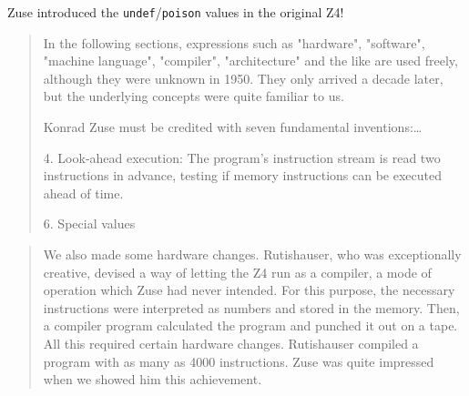 Zuse introduced the \texttt{undef}/\texttt{poison} values in the original Z4!
\begin{quotation}
In the following sections, expressions such as "hardware", "software", "machine language", "compiler",
"architecture" and the like are used freely, although they were unknown in 1950. They only arrived a decade
later, but the underlying concepts were quite familiar to us.

Konrad Zuse must be credited with seven fundamental inventions:\dots

4. Look-ahead execution: The program's instruction stream is read two instructions in advance, testing if memory instructions can be executed ahead of time.

6. Special values
\end{quotation}

\begin{quotation}
    We also made some hardware changes. Rutishauser, who was exceptionally creative, devised a way of
letting the Z4 run as a compiler, a mode of operation which Zuse had never intended. For this purpose, the
necessary instructions were interpreted as numbers and stored in the memory. Then, a compiler program
calculated the program and punched it out on a tape. All this required certain hardware changes. Rutishauser
compiled a program with as many as 4000 instructions. Zuse was quite impressed when we showed him this
achievement.
\end{quotation}
